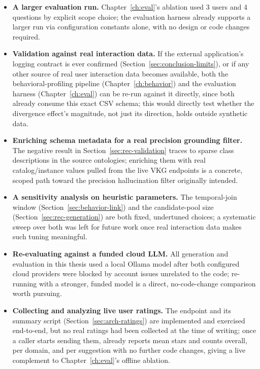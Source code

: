 \begin{itemize}
    \item \textbf{A larger evaluation run.} Chapter~\ref{ch:eval}'s ablation used 3 users and 4
        questions by explicit scope choice; the evaluation harness already supports a larger run via
        configuration constants alone, with no design or code changes required.
    \item \textbf{Validation against real interaction data.} If the external application's logging
        contract is ever confirmed (Section~\ref{sec:conclusion-limits}), or if any other source of
        real user interaction data becomes available, both the behavioral-profiling pipeline
        (Chapter~\ref{ch:behavior}) and the evaluation harness (Chapter~\ref{ch:eval}) can be
        re-run against it directly, since both already consume this exact CSV schema; this would
        directly test whether the divergence effect's magnitude, not just its direction, holds
        outside synthetic data.
    \item \textbf{Enriching schema metadata for a real precision grounding filter.} The negative
        result in Section~\ref{sec:rec-validation} traces to sparse class descriptions in the source
        ontologies; enriching them with real catalog/instance values pulled from the live VKG
        endpoints is a concrete, scoped path toward the precision hallucination filter originally
        intended.
    \item \textbf{A sensitivity analysis on heuristic parameters.} The temporal-join window
        (Section~\ref{sec:behavior-link}) and the candidate-pool size
        (Section~\ref{sec:rec-generation}) are both fixed, undertuned choices; a systematic sweep
        over both was left for future work once real interaction data makes such tuning meaningful.
    \item \textbf{Re-evaluating against a funded cloud LLM.} All generation and evaluation in this
        thesis used a local Ollama model after both configured cloud providers were blocked by
        account issues unrelated to the code; re-running with a stronger, funded model is a direct,
        no-code-change comparison worth pursuing.
    \item \textbf{Collecting and analyzing live user ratings.} The  endpoint and
        its summary script (Section~\ref{sec:arch-ratings}) are implemented and exercised
        end-to-end, but no real ratings had been collected at the time of writing; once a caller
        starts sending them,  already reports mean stars and counts
        overall, per domain, and per suggestion with no further code changes, giving a live
        complement to Chapter~\ref{ch:eval}'s offline ablation.
\end{itemize}
